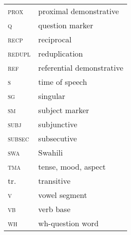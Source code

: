 \begin{multicols}{2}
\begin{tabular}{lp{4.5cm}}
\textsc{prox}&proximal demonstrative\\
\textsc{q}&question marker\\
\textsc{recp}&reciprocal\\
\textsc{redupl}&reduplication\\
\textsc{ref}&referential demonstrative\\
\textsc{s} & time of speech\\
\textsc{sg}& singular\\ %
\textsc{sm}&subject marker\\
\textsc{subj}&subjunctive\\
\textsc{subsec}&subsecutive\\
\textsc{swa}&Swahili\\
\textsc{tma}&tense, mood, aspect\\
tr. &transitive\\
\textsc{v} & vowel segment\\
\textsc{vb} &verb base\\
\textsc{wh} &wh-question word
\end{tabular}

 
\end{multicols} 